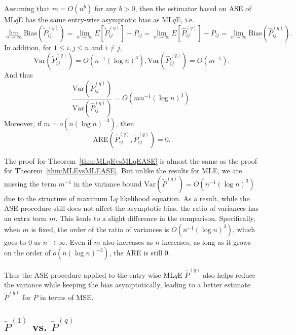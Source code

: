 \begin{theorem}
\label{thm:MLqEvsMLqEASE}
Assuming that $m = O(n^b)$ for any $b > 0$, then the estimator based on ASE of ML$q$E has the same entry-wise asymptotic bias as ML$q$E, i.e.\
\[
	\lim_{n \to \infty} \mathrm{Bias}(\widetilde{P}_{ij}^{(q)}) = \lim_{n \to \infty} E[\widetilde{P}_{ij}^{(q)}] - P_{ij} = \lim_{n \to \infty} E[\hat{P}^{(q)}_{ij}] - P_{ij}
    = \lim_{n \to \infty} \mathrm{Bias}(\hat{P}_{ij}^{(q)}).
\]
In addition, for $1 \le i, j \le n$ and $i \ne j$,
\[
	\mathrm{Var}(\widetilde{P}_{ij}^{(q)}) = O(n^{-1} (\log n)^3),
	\mathrm{Var}(\hat{P}_{ij}^{(q)}) = O(m^{-1}).
\]
And thus
\[
	\frac{\mathrm{Var}(\widetilde{P}_{ij}^{(q)})}{\mathrm{Var}(\hat{P}_{ij}^{(q)})}
    = O(m n^{-1} (\log n)^3).
\]
Moreover, if $m = o(n (\log n)^{-3})$, then
\[
	\mathrm{ARE}(\hat{P}_{ij}^{(q)}, \widetilde{P}_{ij}^{(q)}) = 0.
\]
\end{theorem}

The proof for Theorem~\ref{thm:MLqEvsMLqEASE} is almost the same as the proof for Theorem~\ref{thm:MLEvsMLEASE}. But unlike the results for MLE, we are missing the term $m^{-1}$ in the variance bound $\mathrm{Var}(\widetilde{P}^{(q)}) = O(n^{-1} (\log n)^3)$ due to the structure of maximum L$q$ likelihood equation. As a result, while the ASE procedure still does not affect the asymptotic bias, the ratio of variances has an extra term $m$. This leads to a slight difference in the comparison. Specifically, when $m$ is fixed, the order of the ratio of variances is $O(n^{-1} (\log n)^3)$, which goes to 0 as $n \to \infty$. Even if $m$ also increases as $n$ increases, as long as it grows on the order of $o(n (\log n)^{-3})$, the ARE is still 0. 

Thus the ASE procedure applied to the entry-wise ML$q$E $\hat{P}^{(q)}$ also helps reduce the variance while keeping the bias asymptotically, leading to a better estimate $\widetilde{P}^{(q)}$ for $P$ in terms of MSE.


\subsection[MLE vs. ASE of MLqE]{$\widetilde{P}^{(1)}$ vs. $\widetilde{P}^{(q)}$}

